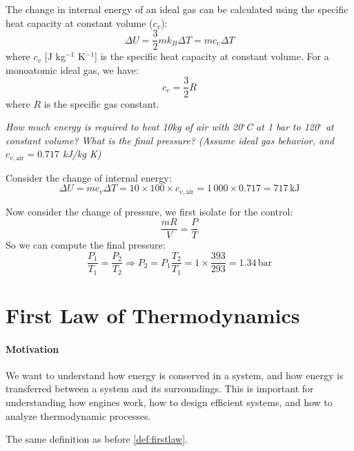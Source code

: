 \documentclass[11pt]{report}
\begin{document}
\begin{definition}
    The change in internal energy of an ideal gas can be calculated using the specific heat capacity at constant volume ($c_v$):
    \begin{equation}
        \Delta U = \frac{3}{2} mk_B \Delta T = m c_v \Delta T
    \end{equation}
    where $c_v$ [J kg$^{-1}$ K$^{-1}$] is the specific heat capacity at constant volume. For a monoatomic ideal gas, we have:
    \begin{equation}
        c_v = \frac{3}{2} R
    \end{equation}
    where $R$ is the specific gas constant.
\end{definition}

\begin{example}
    \textit{How much energy is required to heat 10kg of air with 20$^\circ$C at 1 bar to 120$^\circ$ at constant volume? What is the final pressure? (Assume ideal gas behavior, and $c_{v, \text{air}} = 0.717$ kJ/kg K)}

    Consider the change of internal energy:
    $$
        \Delta U = m c_v \Delta T = 10 \times 100 \times c_{v, \text{air}} = 1\,000 \times 0.717 = 717\, \text{kJ}
    $$

    Now consider the change of pressure, we first isolate for the control:
    $$
        \frac{mR}{V} = \frac{P}{T}
    $$
    So we can compute the final pressure:
    $$
        \frac{P_1}{T_1} = \frac{P_2}{T_2} \Rightarrow P_2 = P_1 \frac{T_2}{T_1} = 1 \times \frac{393}{293} = 1.34\, \text{bar}
    $$
\end{example}

\section{First Law of Thermodynamics}
\begin{shaded}
\paragraph{Motivation} We want to understand how energy is conserved in a system, and how energy is transferred between a system and its surroundings. This is important for understanding how engines work, how to design efficient systems, and how to analyze thermodynamic processes.
\end{shaded}  
The same definition as before \ref{def:firstlaw}.
\end{document}
